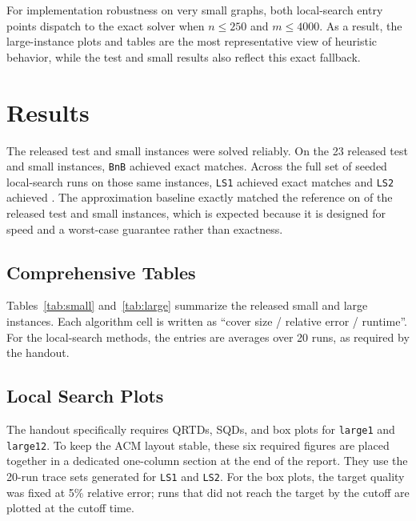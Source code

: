 \documentclass[sigconf,nonacm]{acmart}
\begin{document}
For implementation robustness on very small graphs, both local-search entry points dispatch to the exact solver when $n \le 250$ and $m \le 4000$. As a result, the large-instance plots and tables are the most representative view of heuristic behavior, while the test and small results also reflect this exact fallback.

\section{Results}
The released test and small instances were solved reliably. On the 23 released test and small instances, \texttt{BnB} achieved \BnBPassRate exact matches. Across the full set of seeded local-search runs on those same instances, \texttt{LS1} achieved \LSOnePassRate exact matches and \texttt{LS2} achieved \LSTwoPassRate. The approximation baseline exactly matched the reference on \ApproxExactRate of the released test and small instances, which is expected because it is designed for speed and a worst-case guarantee rather than exactness.

\subsection{Comprehensive Tables}
Tables~\ref{tab:small} and~\ref{tab:large} summarize the released small and large instances. Each algorithm cell is written as ``cover size / relative error / runtime''. For the local-search methods, the entries are averages over 20 runs, as required by the handout.

\onecolumn
\begin{landscape}
\small

\end{landscape}

\begin{landscape}
\small

\end{landscape}
\twocolumn

\subsection{Local Search Plots}
The handout specifically requires QRTDs, SQDs, and box plots for \texttt{large1} and \texttt{large12}. To keep the ACM layout stable, these six required figures are placed together in a dedicated one-column section at the end of the report. They use the 20-run trace sets generated for \texttt{LS1} and \texttt{LS2}. For the box plots, the target quality was fixed at 5\% relative error; runs that did not reach the target by the cutoff are plotted at the cutoff time.
\end{document}

